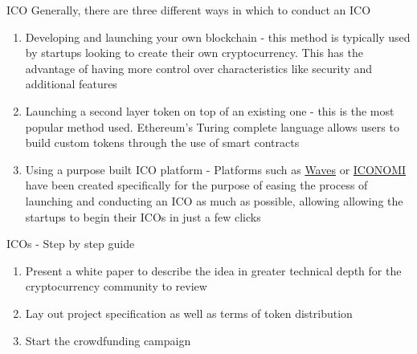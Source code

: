 \documentclass[9pt]{beamer}
\begin{document}

\begin{frame}{ICO}
	Generally, there are three different ways in which to conduct an ICO
	\begin{enumerate}
		\item Developing and launching your own blockchain - this method is typically used by startups looking to create their own cryptocurrency. This has the advantage of having more control over characteristics like security and additional features
		\item Launching a second layer token on top of an existing one - this is the most popular method used. Ethereum's Turing complete language allows users to build custom tokens through the use of smart contracts
		\item Using a purpose built ICO platform - Platforms such as \href{https://wavesplatform.com/product}{Waves} or \href{https://www.iconomi.net}{ICONOMI} have been created specifically for the purpose of easing the process of launching and conducting an ICO as much as possible, allowing allowing the startups to begin their ICOs in just a few clicks
	\end{enumerate}
\end{frame}


\begin{frame}{ICOs - Step by step guide}
	\begin{enumerate}
		\item Present a white paper to describe the idea in greater technical depth for the cryptocurrency community to review
		\item Lay out project specification as well as terms of token distribution
		\item Start the crowdfunding campaign
	\end{enumerate}
\end{frame}


\end{document}
